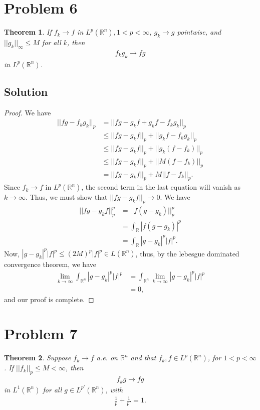 \documentclass[10pt,a4paper]{article}
\theoremstyle{theorem}
\newtheorem{theorem}{Theorem}
\theoremstyle{definition}
\begin{document}
\section*{Problem 6}
\begin{theorem}
If $f_k \to f$ in $L^p(\mathbb{R}^n), 1 < p < \infty$, $g_k \to g$ pointwise, and $||g_k||_\infty \leq M$ for all $k$, then 
\begin{align*}
f_k g_k \to fg
\end{align*}
in $L^p (\mathbb{R}^n)$.
\end{theorem}

\subsection*{Solution}
\begin{proof}
We have
\begin{align*}
||fg - f_kg_k||_p &= ||fg - g_kf + g_k f - f_k g_k||_p\\
&\leq ||fg - g_kf||_p + ||g_k f - f_k g_k||_p\\
&\leq ||fg - g_kf||_p + ||g_k (f - f_k)||_p\\
&\leq ||fg - g_kf||_p + ||M (f - f_k)||_p\\
&= ||fg - g_kf||_p + M||f - f_k||_p.
\end{align*}
Since $f_k \to f$ in $L^p(\mathbb{R}^n)$, the second term in the last equation will vanish as $k \to \infty$. Thus, we must show that $||fg - g_kf||_p \to 0$. We have
\begin{align*}
||fg - g_kf||_p^p &= ||f(g - g_k)||_p^p\\
&= \int_\mathbb{R} |f(g - g_k)|^p\\
&= \int_\mathbb{R} |g - g_k|^p|f|^p.
\end{align*}
Now, $|g - g_k|^p|f|^p \leq (2M)^p|f|^p \in L(\mathbb{R}^n)$, thus, by the lebesgue dominated convergence theorem, we have
\begin{align*}
\lim_{k \to \infty} \int_{\mathbb{R}^n} |g - g_k|^p|f|^p &=  \int_{\mathbb{R}^n} \lim_{k \to \infty} |g - g_k|^p|f|^p\\
&= 0,
\end{align*}
and our proof is complete.
\end{proof}

\section*{Problem 7}
\begin{theorem}
Suppose $f_k \to f$ a.e. on $\mathbb{R}^n$ and that $f_k, f \in L^p(\mathbb{R}^n)$, for $1 < p < \infty$. If $||f_k||_p \leq M < \infty$, then 
\begin{align*}
f_kg \to fg 
\end{align*}
in $L^1(\mathbb{R}^n)$ for all $g \in L^{p'}(\mathbb{R}^n)$, with 
\begin{align*}
\frac{1}{p} + \frac{1}{p'} = 1.
\end{align*}
\end{theorem}
\end{document}
